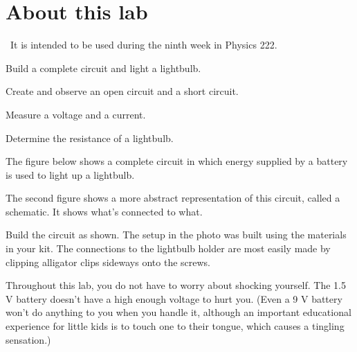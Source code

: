 \renewcommand\thechapter{c2.9a}
\label{lab:covid-electrical-measurements}

\section*{About this lab}

\covid\ 
It is intended to be used during the ninth week in Physics 222.

\apparatus
{}

\begin{goals}

\item[] Build a complete circuit and light a lightbulb.

\item[] Create and observe an open circuit and a short circuit.

\item[] Measure a voltage and a current.

\item[] Determine the resistance of a lightbulb.

\end{goals}


The figure below shows a complete circuit in which energy supplied
by a battery is used to light up a lightbulb. 


The second figure shows a more abstract representation of this circuit,
called a schematic. It shows what's connected to what.


Build the circuit as shown. The setup in the photo was built using the
materials in your kit. The connections to the lightbulb holder are most
easily made by clipping alligator clips sideways onto the screws.

Throughout this lab, you do not have to worry about shocking yourself.
The 1.5 V battery doesn't have a high enough voltage to hurt you.
(Even a 9 V battery won't do anything to you when you handle it,
although an important educational experience for little kids is
to touch one to their tongue, which causes a tingling sensation.)

